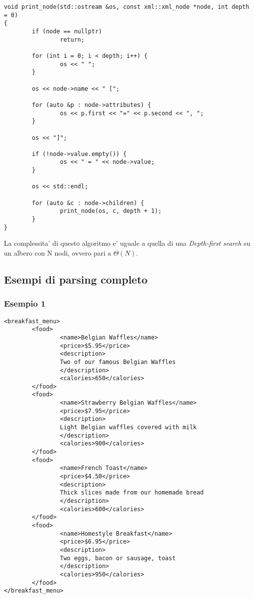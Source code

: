\documentclass[italian,a4paper]{article}
\begin{document}
\begin{verbatim}
void print_node(std::ostream &os, const xml::xml_node *node, int depth = 0)
{
        if (node == nullptr)
                return;

        for (int i = 0; i < depth; i++) {
                os << " ";
        }

        os << node->name << " [";

        for (auto &p : node->attributes) {
                os << p.first << "=" << p.second << ", ";
        }   

        os << "]";

        if (!node->value.empty()) {
                os << " = " << node->value;
        }   

        os << std::endl;

        for (auto &c : node->children) {
                print_node(os, c, depth + 1); 
        }   
}
\end{verbatim}

La complessita' di questo algoritmo e' uguale a quella di una \emph{Depth-first
search} su un albero con N nodi, ovvero pari a $ \Theta(N) $.

\subsection{Esempi di parsing completo}

\subsubsection{Esempio 1}

\begin{mdframed}[frametitle=Input]
\begin{verbatim}
<breakfast_menu>
        <food>
                <name>Belgian Waffles</name>
                <price>$5.95</price>
                <description>
                Two of our famous Belgian Waffles
                </description>
                <calories>650</calories>
        </food>
        <food>
                <name>Strawberry Belgian Waffles</name>
                <price>$7.95</price>
                <description>
                Light Belgian waffles covered with milk
                </description>
                <calories>900</calories>
        </food>
        <food>
                <name>French Toast</name>
                <price>$4.50</price>
                <description>
                Thick slices made from our homemade bread
                </description>
                <calories>600</calories>
        </food>
        <food>
                <name>Homestyle Breakfast</name>
                <price>$6.95</price>
                <description>
                Two eggs, bacon or sausage, toast
                </description>
                <calories>950</calories>
        </food>
</breakfast_menu>
\end{verbatim}
\end{mdframed}
\end{document}
